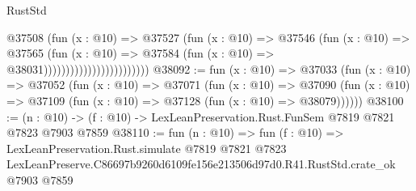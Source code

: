 \begin{lexlean}{RustStd}
\begin{coremodule}
                                        @37508
                                          (fun (x : @10) =>
                                          @37527
                                            (fun (x : @10) =>
                                            @37546
                                              (fun (x : @10) =>
                                              @37565
                                                (fun (x : @10) =>
                                                @37584
                                                  (fun (x : @10) => @38031))))))))))))))))))))))))
@38092 := fun (x : @10) =>
  @37033
    (fun (x : @10) =>
    @37052
      (fun (x : @10) =>
      @37071
        (fun (x : @10) =>
        @37090 (fun (x : @10) => @37109 (fun (x : @10) => @37128 (fun (x : @10) => @38079))))))
@38100 := (n : @10) -> (f : @10) -> LexLeanPreservation.Rust.FunSem @7819 @7821 @7823 @7903 @7859
@38110 := fun (n : @10) =>
  fun (f : @10) =>
  LexLeanPreservation.Rust.simulate
    @7819
    @7821
    @7823
    LexLeanPreserve.C86697b9260d6109fe156e213506d97d0.R41.RustStd.crate_ok
    @7903
    @7859
\end{coremodule}
\end{lexlean}
